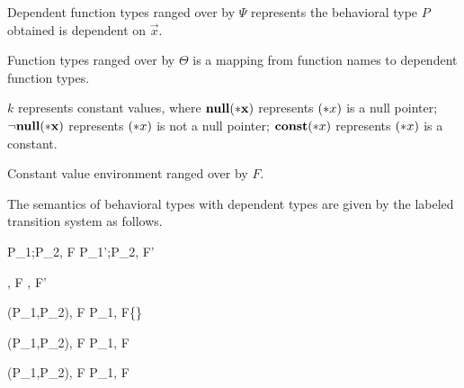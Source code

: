 Dependent function types ranged over by \(\Psi\) represents the behavioral type
\(P\) obtained is dependent on \(\vec{x}\).

Function types ranged over by \(\Theta\) is a mapping from function names to dependent function types.

\(k\) represents constant values, where \(\bf{null}(*x)\) represents \((*x)\) is a null pointer; \(\neg\bf{null}(*x)\) represents \((*x)\) is not a null pointer; \(\mathbf{const}(*x)\) represents \((*x)\) is a constant.

Constant value environment ranged over by \(F\).

The semantics of behavioral types with dependent types are given by the labeled transition system as follows.







{ \langle P_1;P_2, F \rangle \xlongrightarrow{\rho} \langle P_1';P_2, F' \rangle }


{ \langle \Endconst, F \rangle \rightarrow {}, F' \rangle }

{ \langle \Sirx (P_1,P_2), F \rangle \rightarrow \langle P_1, F\cup\{\snull\} \rangle }

{ \langle \Sirx (P_1,P_2), F \rangle \rightarrow \langle P_1, F \rangle }

{ \langle \Sirx (P_1,P_2), F \rangle \rightarrow \langle P_1, F \rangle }

